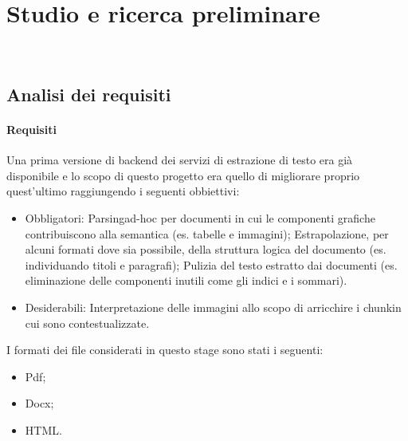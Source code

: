 \chapter{Studio e ricerca preliminare}
\label{cap:analisi-preliminare}

 \\

\section{Analisi dei requisiti}

\subsubsection{Requisiti}
\label{subsec:requisiti}
Una prima versione di backend dei servizi di estrazione di testo era già disponibile e lo scopo di questo progetto era quello di migliorare proprio quest'ultimo raggiungendo i seguenti obbiettivi:

\begin{itemize}
    \item Obbligatori:
    \subitem \gls{Parsing}\glsfirstoccur ad-hoc per documenti in cui le componenti grafiche contribuiscono alla semantica (es. tabelle e immagini);
    \subitem Estrapolazione, per alcuni formati dove sia possibile, della struttura logica del documento (es. individuando titoli e paragrafi);
    \subitem Pulizia del testo estratto dai documenti (es. eliminazione delle componenti inutili come gli indici e i sommari).
    \item Desiderabili:
    \subitem Interpretazione delle immagini allo scopo di arricchire i \gls{chunk}\glsfirstoccur in cui sono contestualizzate. 
\end{itemize}

I formati dei file considerati in questo stage sono stati i seguenti:
\begin{itemize}
    \item Pdf;
    \item Docx;
    \item HTML.
\end{itemize}

